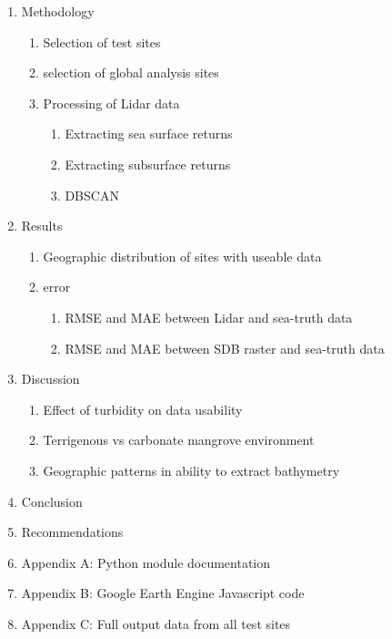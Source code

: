 \begin{enumerate}
      \item Methodology 
      \begin{enumerate}
            \item Selection of test sites
            \item selection of global analysis sites
            \item Processing of Lidar data
            \begin{enumerate}
                  \item Extracting sea surface returns
                  \item Extracting subsurface returns
                  \item DBSCAN
            \end{enumerate}
      \end{enumerate}
      \item Results 
      \begin{enumerate}
            \item Geographic distribution of sites with useable data
            \item error
            \begin{enumerate}
                  \item RMSE and MAE between Lidar and sea-truth data
                  \item RMSE and MAE between SDB raster and sea-truth data
            \end{enumerate}
      \end{enumerate}
      \item Discussion
      \begin{enumerate}
            \item Effect of turbidity on data usability
            \item Terrigenous vs carbonate mangrove environment
            \item Geographic patterns in ability to extract bathymetry
      \end{enumerate}
      \item Conclusion
      \item Recommendations
      \item Appendix A: Python module documentation
      \item Appendix B: Google Earth Engine Javascript code
      \item Appendix C: Full output data from all test sites
\end{enumerate}
